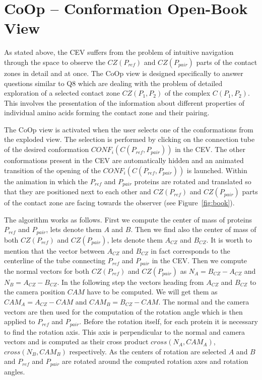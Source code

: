 \documentclass[journal]{vgtc}                %
\begin{document}
\section{CoOp -- Conformation Open-Book View}
As stated above, the CEV suffers from the problem of intuitive navigation through the space to observe the $CZ(P_{ref})$ and $CZ(P_{pair})$ parts of the contact zones in detail and at once.
The CoOp view is designed specifically to answer questions similar to Q8 which are dealing with the problem of detailed exploration of a selected contact zone $CZ(P_1,P_2)$ of the complex $C(P_1,P_2)$.
This involves the presentation of the information about different properties of individual amino acids forming the contact zone and their pairing.

The CoOp view is activated when the user selects one of the conformations from the exploded view. 
The selection is performed by clicking on the connection tube of the desired conformation $CONF_i(C(P_{ref},P_{pair}))$ in the CEV.
The other conformations present in the CEV are automatically hidden and an animated transition of the opening of the $CONF_i(C(P_{ref},P_{pair}))$ is launched.
Within the animation in which the $P_{ref}$ and $P_{pair}$ proteins are rotated and translated so that they are positioned next to each other and $CZ(P_{ref})$ and $CZ(P_{pair})$ parts of the contact zone are facing towards the observer (see Figure~\ref{fig:book}). 

The algorithm works as follows.
First we compute the center of mass of proteins $P_{ref}$ and $P_{pair}$, lets denote them $A$ and $B$.
Then we find also the center of mass of both $CZ(P_{ref})$ and $CZ(P_{pair})$, lets denote them $A_{CZ}$ and $B_{CZ}$.
It is worth to mention that the vector between $A_{CZ}$ and $B_{CZ}$ in fact corresponds to the centerline of the tube connecting $P_{ref}$ and $P_{pair}$ in the CEV.
Then we compute the normal vectors for both $CZ(P_{ref})$ and $CZ(P_{pair})$ as $N_A = B_{CZ} - A_{CZ}$ and $N_B = A_{CZ} - B_{CZ}$.
In the following step the vectors heading from $A_{CZ}$ and $B_{CZ}$ to the camera position $CAM$ have to be computed.
We will get them as $CAM_A = A_{CZ} - CAM$ and $CAM_B = B_{CZ} - CAM$.
The normal and the camera vectors are then used for the computation of the rotation angle which is then applied to $P_{ref}$ and $P_{pair}$.
Before the rotation itself, for each protein it is necessary to find the rotation axis.
This axis is perpendicular to the normal and camera vectors and is computed as their cross product $cross(N_A,CAM_A)$, $cross(N_B,CAM_B)$ respectively.
As the centers of rotation are selected $A$ and $B$ and $P_{ref}$ and $P_{pair}$ are rotated around the computed rotation axes and rotation angles.
\end{document}
